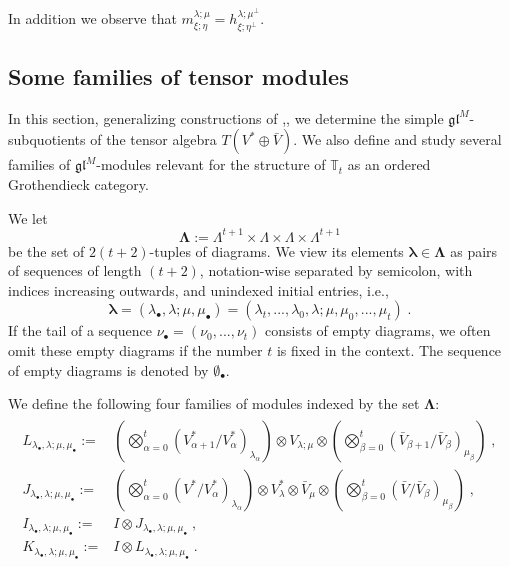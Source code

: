 \documentclass[12pt]{article}
\def\TT {{\mathbb T}}     %
\def\mk {\mathfrak}
\begin{document}
In addition we observe that $m^{\lambda;\mu}_{\xi;\eta}=h^{\lambda;\mu^{\perp}}_{\xi;\eta^{\perp}}$.


\subsection{Some families of tensor modules}

In this section, generalizing constructions of \cite{Chirvasitu-Penkov-RC},\cite{Chirvasitu-Penkov-UTC}, we determine the simple $\mk{gl}^M$-subquotients of the tensor algebra $T(V^*\oplus \bar V)$. We also define and study several families of $\mk{gl}^M$-modules relevant for the structure of $\TT_t$ as an ordered Grothendieck category.

We let
$$
\bm\Lambda:=\Lambda^{t+1}\times\Lambda\times\Lambda\times\Lambda^{t+1}
$$
be the set of $2(t+2)$-tuples of diagrams. We view its elements $\bm\lambda\in\bm\Lambda$ as pairs of sequences of length $(t+2)$, notation-wise separated by semicolon, with indices increasing outwards, and unindexed initial entries, i.e.,
$$
\bm\lambda=(\lambda_\bullet,\lambda;\mu,\mu_\bullet)=(\lambda_t,...,\lambda_0,\lambda;\mu,\mu_0,...,\mu_t)\;.
$$
If the tail of a sequence $\nu_\bullet=(\nu_0,...,\nu_t)$ consists of empty diagrams, we often omit these empty diagrams if the number $t$ is fixed in the context. The sequence of empty diagrams is denoted by $\emptyset_\bullet$.

We define the following four families of modules indexed by the set $\bm\Lambda$:
\begin{gather}\label{For LJITlambda}
\begin{array}{rl}
L_{\lambda_\bullet,\lambda;\mu,\mu_\bullet} :=& \left(\bigotimes\limits_{\alpha=0}^t (V^*_{\alpha+1}/V^*_{\alpha})_{\lambda_\alpha}\right)\otimes V_{\lambda;\mu}\otimes \left(\bigotimes\limits_{\beta=0}^t (\bar V_{\beta+1}/\bar V_{\beta})_{\mu_\beta}\right)\;, \\
J_{\lambda_\bullet,\lambda;\mu,\mu_\bullet} :=& \left(\bigotimes\limits_{\alpha=0}^t (V^*/V^*_{\alpha})_{\lambda_\alpha}\right)\otimes V^*_{\lambda}\otimes \bar V_{\mu}\otimes \left(\bigotimes\limits_{\beta=0}^t (\bar V/\bar V_{\beta})_{\mu_\beta}\right) \;,\\
I_{\lambda_\bullet,\lambda;\mu,\mu_\bullet} :=& I\otimes J_{\lambda_\bullet,\lambda;\mu,\mu_\bullet} \;,\\
K_{\lambda_\bullet,\lambda;\mu,\mu_\bullet} :=& I\otimes L_{\lambda_\bullet,\lambda;\mu,\mu_\bullet} \;.
\end{array}
\end{gather}
\end{document}
